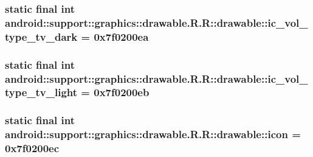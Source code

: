 \hypertarget{classandroid_1_1support_1_1graphics_1_1drawable_1_1_r_1_1drawable_cb2286756a8e80772f03da5f2152eb10}{
\subsubsection[{ic\_\-vol\_\-type\_\-tv\_\-dark}]{\setlength{\rightskip}{0pt plus 5cm}static final int android::support::graphics::drawable.R.R::drawable::ic\_\-vol\_\-type\_\-tv\_\-dark = 0x7f0200ea}}
\label{classandroid_1_1support_1_1graphics_1_1drawable_1_1_r_1_1drawable_cb2286756a8e80772f03da5f2152eb10}


\hypertarget{classandroid_1_1support_1_1graphics_1_1drawable_1_1_r_1_1drawable_4537d0330dc078d71bb95ed0a1ea0143}{
\subsubsection[{ic\_\-vol\_\-type\_\-tv\_\-light}]{\setlength{\rightskip}{0pt plus 5cm}static final int android::support::graphics::drawable.R.R::drawable::ic\_\-vol\_\-type\_\-tv\_\-light = 0x7f0200eb}}
\label{classandroid_1_1support_1_1graphics_1_1drawable_1_1_r_1_1drawable_4537d0330dc078d71bb95ed0a1ea0143}


\hypertarget{classandroid_1_1support_1_1graphics_1_1drawable_1_1_r_1_1drawable_7bd8e136e28cbe58b715fba6a96b22e5}{
\subsubsection[{icon}]{\setlength{\rightskip}{0pt plus 5cm}static final int android::support::graphics::drawable.R.R::drawable::icon = 0x7f0200ec}}
\label{classandroid_1_1support_1_1graphics_1_1drawable_1_1_r_1_1drawable_7bd8e136e28cbe58b715fba6a96b22e5}


